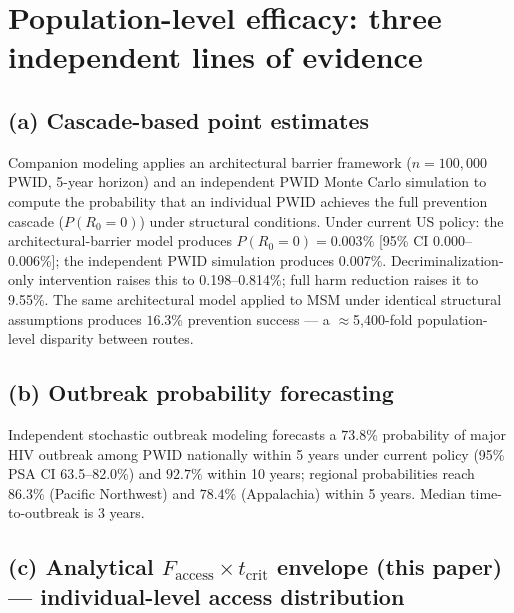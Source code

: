 \documentclass[10pt,letterpaper]{article}
\theoremstyle{definition}
\theoremstyle{remark}
\newcommand{\Faccess}{F_{\text{access}}}
\newcommand{\tcrit}{t_{\text{crit}}}
\begin{document}
\section*{Population-level efficacy: three independent lines of evidence}

\subsection*{(a) Cascade-based point estimates}

Companion modeling\cite{demidont_companion} applies an architectural barrier framework ($n = 100{,}000$ PWID, 5-year horizon) and an independent PWID Monte Carlo simulation to compute the probability that an individual PWID achieves the full prevention cascade ($P(R_{0}=0)$) under structural conditions. Under current US policy: the architectural-barrier model produces $P(R_{0}=0) = 0.003\%$ [95\% CI 0.000--0.006\%]; the independent PWID simulation produces $0.007\%$. Decriminalization-only intervention raises this to 0.198--0.814\%; full harm reduction raises it to 9.55\%. The same architectural model applied to MSM under identical structural assumptions produces $16.3\%$ prevention success --- a $\approx$5{,}400-fold population-level disparity between routes.

\subsection*{(b) Outbreak probability forecasting}

Independent stochastic outbreak modeling\cite{demidont_companion} forecasts a $73.8\%$ probability of major HIV outbreak among PWID nationally within 5 years under current policy (95\% PSA CI 63.5--82.0\%) and $92.7\%$ within 10 years; regional probabilities reach $86.3\%$ (Pacific Northwest) and $78.4\%$ (Appalachia) within 5 years. Median time-to-outbreak is 3 years.

\subsection*{(c) Analytical $\Faccess \times \tcrit$ envelope (this paper) --- individual-level access distribution}
\end{document}
